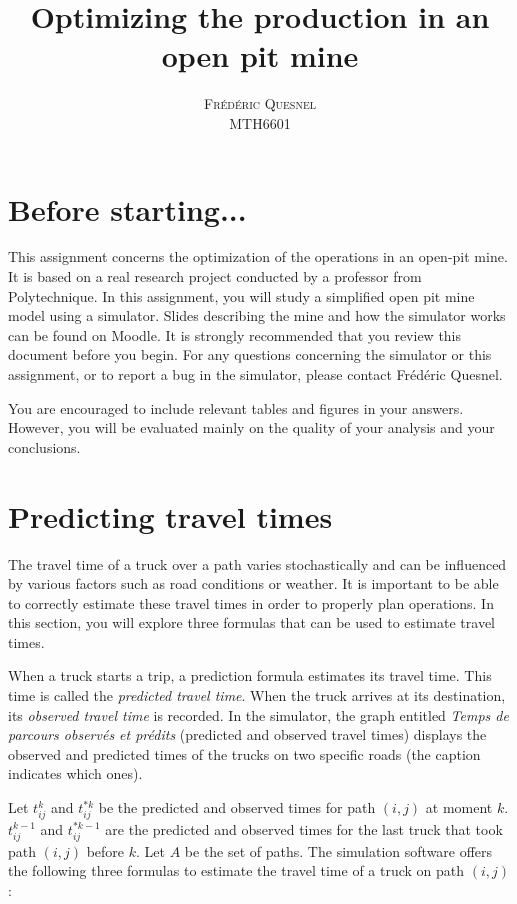 \documentclass[letterpaper,12pt]{article}
\title{ Optimizing the production in an open pit mine}
\author{\textsc{\large{Frédéric Quesnel}} \\ MTH6601}
\begin{document}
	
	\maketitle
	
	\setcounter{section}{-1}
	\section{Before starting...}
	
	This assignment concerns the optimization of the operations in an open-pit mine. It is based on a real research project conducted by a professor from Polytechnique. In this assignment, you will study a simplified open pit mine model using a simulator. Slides describing the mine and how the simulator works can be found on Moodle. It is strongly recommended that you review this document before you begin. For any questions concerning the simulator or this assignment, or to report a bug in the simulator, please contact Frédéric Quesnel.
	
	
	You are encouraged to include relevant tables and figures in your answers. However, you will be evaluated mainly on the quality of your analysis and your conclusions.
	
	
	\section{Predicting travel times}
	
	The travel time of a truck over a path varies stochastically and can be influenced by various factors such as road conditions or weather. It is important to be able to correctly estimate these travel times in order to properly plan operations. In this section, you will explore three formulas that can be used to estimate travel times.
	
	
	When a truck starts a trip, a prediction formula estimates its travel time. This time is called the \textit{predicted travel time}. When the truck arrives at its destination, its \textit{observed travel time} is recorded. In the simulator, the graph entitled \textit{Temps de parcours observés et prédits} (predicted and observed travel times) displays the observed and predicted times of the trucks on two specific roads (the caption indicates which ones).
	
	Let $t_{ij}^k$ and $t^{*k}_{ij}$ be the predicted and observed times for path $(i, j)$ at moment $k$. $t_{ij}^{k-1}$ and $t^{*k-1}_{ij}$ are the predicted and observed times for the last truck that took path $(i, j)$ before $k$. Let $A$ be the set of paths. The simulation software offers the following three formulas to estimate the travel time of a truck on path $(i, j)$ : 
	
\end{document}
